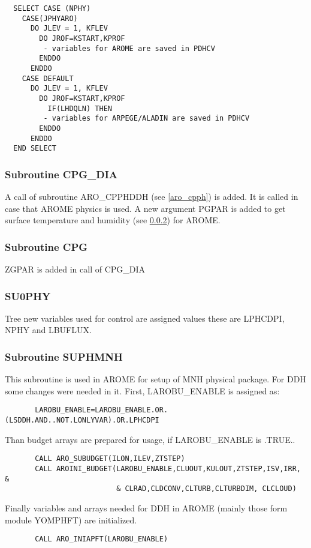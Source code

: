  \begin{verbatim}
  SELECT CASE (NPHY)
    CASE(JPHYARO)
      DO JLEV = 1, KFLEV
        DO JROF=KSTART,KPROF
         - variables for AROME are saved in PDHCV
        ENDDO
      ENDDO
    CASE DEFAULT
      DO JLEV = 1, KFLEV
        DO JROF=KSTART,KPROF
          IF(LHDQLN) THEN
         - variables for ARPEGE/ALADIN are saved in PDHCV
        ENDDO
      ENDDO
  END SELECT
    \end{verbatim}


  \subsubsection{Subroutine CPG\_DIA}
A call of subroutine ARO\_CPPHDDH (see \ref{aro_cpph}) is added. It is called in case that AROME physics is used. A new argument PGPAR is added to get surface temperature and humidity (see \ref{lcpg}) for AROME. 

  \subsubsection{Subroutine CPG}
  \label{lcpg}
       ZGPAR is added in call of CPG\_DIA

  \subsubsection{SU0PHY}
Tree new variables used for control are assigned values these are LPHCDPI, NPHY and LBUFLUX.

  \subsubsection{Subroutine SUPHMNH}
This subroutine is used in AROME for setup of MNH physical package. For DDH some changes were needed in it. First, LAROBU\_ENABLE is assigned as:
    \begin{verbatim}
       LAROBU_ENABLE=LAROBU_ENABLE.OR.(LSDDH.AND..NOT.LONLYVAR).OR.LPHCDPI
    \end{verbatim}
Than budget arrays are prepared for usage, if LAROBU\_ENABLE is .TRUE..
    \begin{verbatim}
       CALL ARO_SUBUDGET(ILON,ILEV,ZTSTEP)
       CALL AROINI_BUDGET(LAROBU_ENABLE,CLUOUT,KULOUT,ZTSTEP,ISV,IRR, &
                          & CLRAD,CLDCONV,CLTURB,CLTURBDIM, CLCLOUD)
    \end{verbatim}
Finally variables and arrays needed for DDH in AROME (mainly those form module YOMPHFT) are initialized.
    \begin{verbatim}
       CALL ARO_INIAPFT(LAROBU_ENABLE)    
    \end{verbatim}

